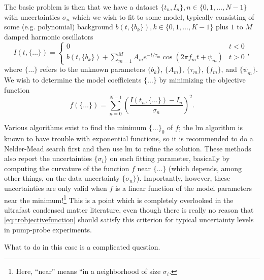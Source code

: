 The basic problem is then that we have a dataset $\{t_n, I_n\}, n\in \{0, 1, \ldots, N-1\}$ with uncertainties $\sigma_n$ which we wish to fit to some model, typically consisting of some (e.g. polynomial) background $b(t, \{b_k\}), k\in\{0, 1, \ldots, K-1\}$ plus $1$ to $M$ damped harmonic oscillators
\begin{equation}
I(t, \{\ldots\}) = \begin{cases}
0 & t<0\\
b(t, \{b_k\})+\sum_{m=1}^M A_m e^{-t/\tau_m} \cos (2\pi f_m t + \psi_m) & t>0
\end{cases},
\end{equation}
where $\{\ldots\}$ refers to the unknown parameters $\{b_k\}$, $\{A_m\}$, $\{\tau_m\}$, $\{f_m\}$, and $\{\psi_m\}$.
We wish to determine the model coefficients $\{\ldots\}$ by minimizing the objective function
\begin{equation}\label{eq:trobjectivefunction}
f(\{\ldots\}) = \sum_{n=0}^{N-1}\left(\frac{I(t_n, \{\ldots\})-I_n}{\sigma_n}\right)^2.
\end{equation}

Various algorithms exist to find the minimum $\{...\}_0$ of $f$; the \gls{lm} algorithm \citep{levenberg_method_1944,marquardt_algorithm_1963} is known to have trouble with exponential functions, so it is recommended to do a Nelder-Mead search \citep{nelder_simplex_1965} first and then use \gls{lm} to refine the solution.
These methods also report the uncertainties $\{\sigma_i\}$ on each fitting parameter, basically by computing the curvature of the function $f$ near $\{\ldots\}$ (which depends, among other things, on the data uncertainty $\{\sigma_n\}$).
Importantly, however, these uncertainties are only valid when $f$ is a linear function of the model parameters near the minimum!\footnote{Here, ``near'' means ``in a neighborhood of size $\sigma_i$.}
This is a point which is completely overlooked in the ultrafast condensed matter literature, even though there is really no reason that \cref{eq:trobjectivefunction} should satisfy this criterion for typical uncertainty levels in pump-probe experiments.

What to do in this case is a complicated question.
